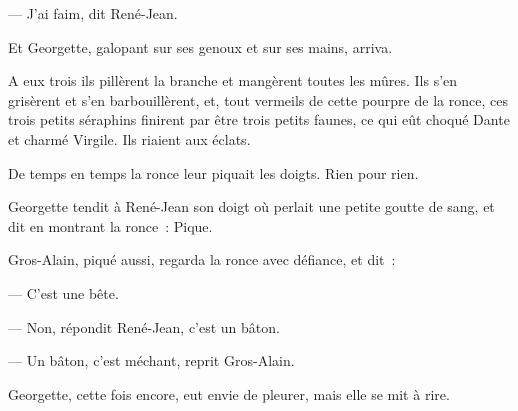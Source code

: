 \documentclass[french,twoside]{book} %
\begin{document}
— J’ai faim, dit René-Jean.\par
Et Georgette, galopant sur ses genoux et sur ses mains, arriva.\par
A eux trois ils pillèrent la branche et mangèrent toutes les mûres. Ils s’en grisèrent et s’en barbouillèrent, et, tout vermeils de cette pourpre de la ronce, ces trois petits séraphins finirent par être trois petits faunes, ce qui eût choqué Dante et charmé Virgile. Ils riaient aux éclats.\par
De temps en temps la ronce leur piquait les doigts. Rien pour rien.\par
Georgette tendit à René-Jean son doigt où perlait  une petite goutte de sang, et dit en montrant la ronce : Pique.\par
Gros-Alain, piqué aussi, regarda la ronce avec défiance, et dit :\par
— C’est une bête.\par
— Non, répondit René-Jean, c’est un bâton.\par
— Un bâton, c’est méchant, reprit Gros-Alain.\par
Georgette, cette fois encore, eut envie de pleurer, mais elle se mit à rire.
\end{document}
